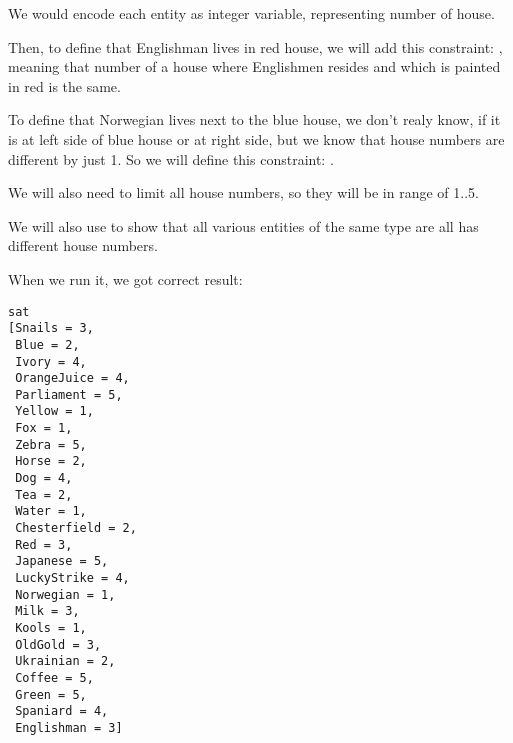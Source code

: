 We would encode each entity as integer variable, representing number of house.

Then, to define that Englishman lives in red house, we will add this constraint: , meaning that number of a house where Englishmen resides and which is painted in red is the same.

To define that Norwegian lives next to the blue house, we don't realy know, if it is at left side of blue house or at right side, but we know that house numbers are different by just 1.
So we will define this constraint: .

We will also need to limit all house numbers, so they will be in range of 1..5.

We will also use  to show that all various entities of the same type are all has different house numbers.



When we run it, we got correct result:

\begin{lstlisting}
sat
[Snails = 3,
 Blue = 2,
 Ivory = 4,
 OrangeJuice = 4,
 Parliament = 5,
 Yellow = 1,
 Fox = 1,
 Zebra = 5,
 Horse = 2,
 Dog = 4,
 Tea = 2,
 Water = 1,
 Chesterfield = 2,
 Red = 3,
 Japanese = 5,
 LuckyStrike = 4,
 Norwegian = 1,
 Milk = 3,
 Kools = 1,
 OldGold = 3,
 Ukrainian = 2,
 Coffee = 5,
 Green = 5,
 Spaniard = 4,
 Englishman = 3]
\end{lstlisting}

